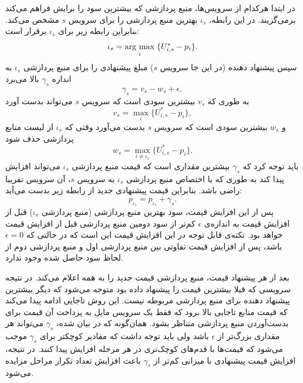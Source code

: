       در ابتدا هرکدام از سرویس‌ها، منبع پردازشی که بیشترین سود را برایش فراهم می‌کند برمی‌گزیند.
      در این رابطه، $\iota_s$ بهترین منبع پردازشی را برای سرویس $s$ مشخص می‌کند.
      بنابراین رابطه زیر برای $\iota_s$ برقرار است:
      \begin{equation}\label{eqn:argmax_benefit}
        \iota_s = \underset{i}{\operatorname{arg}\,\operatorname{max}}\;\{U_{i,s}^* - p_i\}.
      \end{equation}
      سپس پیشنهاد دهنده (در این جا سرویس $s$) مبلغ پیشنهادی را برای منبع پردازشی $\iota_s$ به اندازه $\gamma_s$ بالا می‌برد
      \begin{equation}\label{eqn:bid_increase_1}
        \gamma_s = v_s - w_s + \epsilon,
      \end{equation}
      به طوری که $v_s$ بیشترین سودی است که سرویس $s$ می‌تواند بدست آورد
      \begin{equation}\label{eqn:bid_increase_2}
        v_s = \max_i\{U_{i,s}^* - p_i\},
      \end{equation}
      و $w_s$ بیشترین سودی است که سرویس $s$ بدست می‌آورد وقتی که $\iota_s$ از لیست منابع پردازشی حذف شود
      \begin{equation}\label{eqn:bid_increase_3}
        w_s = \max_{i \ne \iota_s}\{U_{i,s}^* - p_i\}.
      \end{equation}
      باید توجه کرد که $\gamma_s$ بیشترین مقداری است که قیمت منبع پردازشی $\iota_s$ می‌تواند افزایش پیدا کند به طوری که با اختصاص منبع پردازشی $\iota_s$ به سرویس $s$، آن سرویس تقریبا راضی باشد.
      بنابراین قیمت پیشنهادی جدید از رابطه زیر بدست می‌آید:
      \begin{equation}\label{eqn:bid_increase_4}
        p_{\iota_s} = p_{\iota_s} + \gamma_s.
      \end{equation}
      پس از این افزایش قیمت، سود بهترین منبع پردازشی (منبع پردازشی $\iota_s$) قبل از افزایش قیمت به اندازه‌ی $\epsilon$ کم‌تر از سود دومین منبع پردازشی قبل از افزایش قیمت خواهد بود.
      نکته‌ی قابل توجه در این افزایش قیمت این است که در حالتی که $\epsilon = 0$ باشد، پس از افزایش قیمت تفاوتی بین منبع پردازشی اول و منبع پردازشی دوم از لحاظ سود حاصل شده وجود ندارد.

      بعد از هر پیشنهاد قیمت، منبع پردازشی قیمت جدید را به همه اعلام می‌کند.
      در نتیجه سرویسی که قبلا بیشترین قیمت را پیشنهاد داده بود متوجه می‌شود که دیگر بیشترین پیشنهاد دهنده برای منبع پردازشی مربوطه نیست.
      این روش تاجایی ادامه پیدا می‌کند که قیمت منابع تاجایی بالا برود که فقط یک سرویس مایل به پرداخت آن قیمت برای بدست‌آوردن منبع پردازشی متناظر بشود.
      همان‌گونه که در \cite{auction_algorithms_bertsekas} بیان شده، $\gamma_s$ می‌تواند هر مقداری بزرگ‌تر از $\epsilon$ باشد ولی باید توجه داشت که مقادیر کوچکتر برای $\gamma_s$ موجب می‌شود که قیمت‌ها با قدم‌های کوچک‌تری در هر مرحله افزایش پیدا کنند.
      در نتیجه، افزایش قیمت پیشنهادی با میزانی کم‌تر از $\gamma_s$ باعث افزایش تعداد تکرار مراحل مزایده می‌شود.

